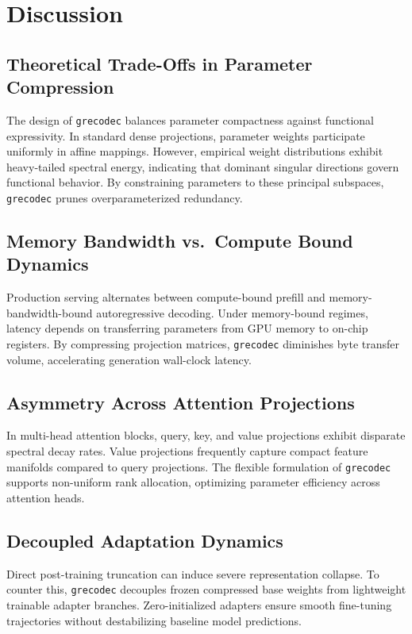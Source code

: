 \section{Discussion}

\subsection{Theoretical Trade-Offs in Parameter Compression}
The design of \texttt{grecodec} balances parameter compactness against functional expressivity. In standard dense projections, parameter weights participate uniformly in affine mappings. However, empirical weight distributions exhibit heavy-tailed spectral energy, indicating that dominant singular directions govern functional behavior. By constraining parameters to these principal subspaces, \texttt{grecodec} prunes overparameterized redundancy.

\subsection{Memory Bandwidth vs.\ Compute Bound Dynamics}
Production serving alternates between compute-bound prefill and memory-bandwidth-bound autoregressive decoding. Under memory-bound regimes, latency depends on transferring parameters from GPU memory to on-chip registers. By compressing projection matrices, \texttt{grecodec} diminishes byte transfer volume, accelerating generation wall-clock latency.

\subsection{Asymmetry Across Attention Projections}
In multi-head attention blocks, query, key, and value projections exhibit disparate spectral decay rates. Value projections frequently capture compact feature manifolds compared to query projections. The flexible formulation of \texttt{grecodec} supports non-uniform rank allocation, optimizing parameter efficiency across attention heads.

\subsection{Decoupled Adaptation Dynamics}
Direct post-training truncation can induce severe representation collapse. To counter this, \texttt{grecodec} decouples frozen compressed base weights from lightweight trainable adapter branches. Zero-initialized adapters ensure smooth fine-tuning trajectories without destabilizing baseline model predictions.

